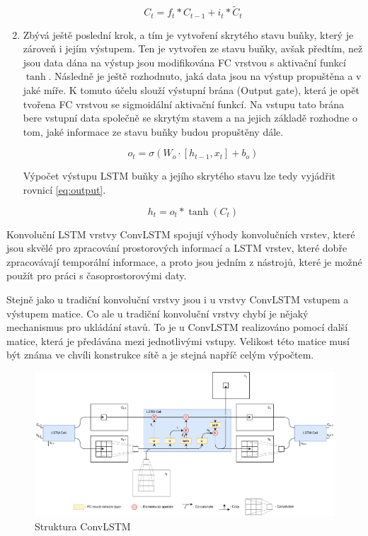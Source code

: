 \begin{enumerate}
\begin{equation}
C_t = f_t * C_{t-1} + i_t * \widetilde{C}_t
\label{eq:cell_state_modification}
\end{equation}


\item Zbývá ještě poslední krok, a tím je vytvoření skrytého stavu buňky, který je zároveň i jejím výstupem.
Ten je vytvořen ze stavu buňky, avšak předtím, než jsou data dána na výstup jsou modifikována FC vrstvou s aktivační funkcí \(\tanh\).
Následně je ještě rozhodnuto, jaká data jsou na výstup propuštěna a v jaké míře.
K tomuto účelu slouží výstupní brána (Output gate), která je opět tvořena FC vrstvou se sigmoidální aktivační funkcí.
Na vstupu tato brána bere vstupní data společně se skrytým stavem a na jejich základě rozhodne o tom, jaké informace ze stavu buňky budou propuštěny dále.

\begin{equation}
o_t = \sigma(W_o \cdot [h_{t-1}, x_t] + b_o)
\label{eq:output_gate}
\end{equation}

Výpočet výstupu LSTM buňky a jejího skrytého stavu lze tedy vyjádřit rovnicí \ref{eq:output}.

\begin{equation}
h_t = o_t * \tanh(C_t)
\label{eq:output}
\end{equation}

\end{enumerate}


Konvoluční LSTM vrstvy ConvLSTM spojují výhody konvolučních vrstev, které jsou skvělé pro zpracování prostorových informací a LSTM vrstev, které dobře zpracovávají temporální informace, a proto jsou jedním z nástrojů, které je možné použít pro práci s časoprostorovými daty.

Stejně jako u tradiční konvoluční vrstvy jsou i u vrstvy ConvLSTM vstupem a výstupem matice.
Co ale u tradiční konvoluční vrstvy chybí je nějaký mechanismus pro ukládání stavů.
To je u ConvLSTM realizováno pomocí další matice, která je předávána mezi jednotlivými vstupy. Velikost této matice musí být známa ve chvíli konstrukce sítě a je stejná napříč celým výpočtem.

\begin{figure}[h!]
	\centering
	\includegraphics[width=\textwidth]{Figures/solution/ConvLSTM_schema.pdf}
	\caption{Struktura ConvLSTM}
	\label{fig:LSTM_architecture}
\end{figure}


